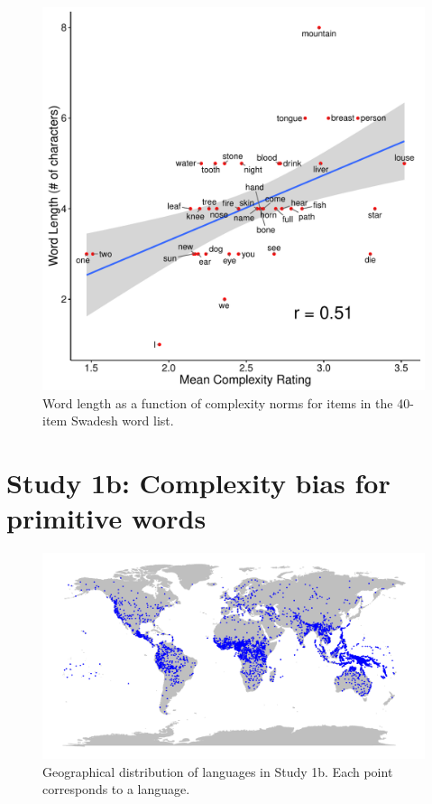\begin{figure}[t!]
\begin{center}
\includegraphics[scale = .6]{figs/chap4_1a.pdf}
\end{center}
\caption{Word length as a function of complexity norms for items in the 40-item Swadesh word list.}
\label{fig:study1a}
\end{figure}


\section{Study 1b: Complexity bias for primitive words}

\begin{figure}[t!]
\begin{center}
\includegraphics[scale = .45]{figs/chap4_1map.pdf}
\end{center}
\caption{Geographical distribution of languages in Study 1b. Each point corresponds to a language.}
\label{fig:study1b_map}
\end{figure}

